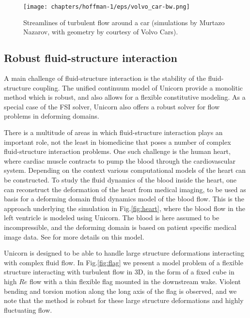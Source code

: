 \begin{figure}[bhpt]

\centerline{
\texttt{[image: chapters/hoffman-1/eps/volvo\_car-bw.png]}
}
\caption{Streamlines of turbulent flow around a car (simulations by Murtazo Nazarov, with geometry by courtesy of Volvo Cars).}
\label{fig:volvo}
\end{figure}

\subsection{Robust fluid-structure interaction}

A main challenge of fluid-structure interaction is the stability of
the fluid-structure coupling. The unified continuum model of Unicorn
provide a monolitic method which is robust, and also allows for a
flexible constitutive modeling.  As a special case of the FSI solver,
Unicorn also offers a robust solver for flow problems in deforming
domains.

There is a multitude of areas in which fluid-structure interaction
plays an important role, not the least in biomedicine that poses a
number of complex fluid-structure interaction problems.  One such
challenge is the human heart, where cardiac muscle contracts to pump
the blood through the cardiovascular system. Depending on the context
various computational models of the heart can be constructed.  To
study the fluid dynamics of the blood inside the heart, one can
reconstruct the deformation of the heart from medical imaging, to be
used as basis for a deforming domain fluid dynamics model of the blood
flow.  This is the approach underlying the simulation in
Fig.\ref{fig:heart}, where the blood flow in the left ventricle is
modeled using Unicorn. The blood is here assumed to be incompressible,
and the deforming domain is based on patient specific medical image
data. See \cite{Aechtner2009} for more details on this model.

Unicorn is designed to be able to handle large structure deformations
interacting with complex fluid flow.  In Fig.\ref{fig:flag} we present
a model problem of a flexible structure interacting with turbulent
flow in 3D, in the form of a fixed cube in high $Re$ flow with a thin
flexible flag mounted in the downstream wake.  Violent bending and
torsion motion along the long axis of the flag is observed, and we
note that the method is robust for these large structure deformations
and highly fluctuating flow.

